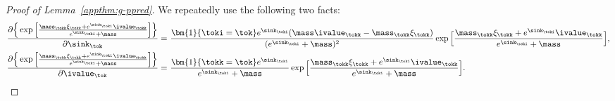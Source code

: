 \begin{proof}[Proof of Lemma~\ref{appthm:g-ppred}]
We repeatedly use the following two facts:
\begin{align*}
\frac{\partial\Big\{\exp\Big[\frac{\mass_\tokk\xi_\tokk+e^{\sink_\toki}\ivalue_\tokk}{e^{\sink_\toki}+\mass}\Big]\Big\}}{\partial \sink_\tok} = &~ \frac{\bm{1}\{\toki=\tok\}e^{\sink_\toki}(\mass\ivalue_\tokk-\mass_\tokk\xi_\tokk)}{(e^{\sink_\toki}+\mass)^2} \exp\Big[\frac{\mass_\tokk\xi_\tokk+e^{\sink_\toki}\ivalue_\tokk}{e^{\sink_\toki}+\mass}\Big],
\nonumber\\
\frac{\partial\Big\{\exp\Big[\frac{\mass_\tokk\xi_\tokk+e^{\sink_\toki}\ivalue_\tokk}{e^{\sink_\toki}+\mass}\Big]\Big\}}{\partial \ivalue_\tok} = &~ \frac{\bm{1}\{\tokk=\tok\}e^{\sink_\toki}}{e^{\sink_\toki}+\mass} \exp\Big[\frac{\mass_\tokk\xi_\tokk+e^{\sink_\toki}\ivalue_\tokk}{e^{\sink_\toki}+\mass}\Big].
\nonumber
\end{align*}


\end{proof}
